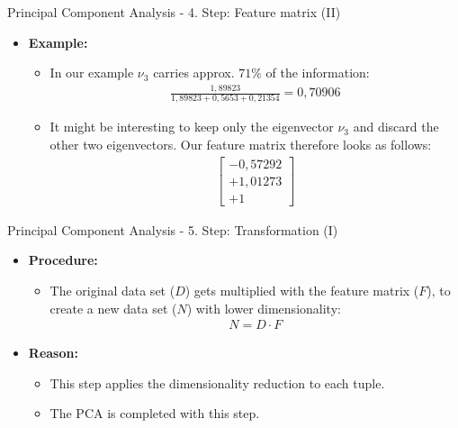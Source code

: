 \begin{frame}{Principal Component Analysis - 4. Step: Feature matrix (II)}
	\begin{itemize}
		\item \textbf{Example:}
		\begin{itemize}
			\item In our example $\nu_3$ carries approx. $71\%$ of the 
			information: \\
			\begin{align}
				\frac{1,89823}{1,89823+0,5653+0,21354} = 0,70906
			\end{align}
			\item It might be interesting to keep only the eigenvector $\nu_3$ 
			and discard the other two eigenvectors. Our feature matrix 
			therefore looks as follows:
			\begin{align}
				\begin{bmatrix} -0,57292 \\ +1,01273 \\ +1\end{bmatrix}
			\end{align}
		\end{itemize}
	\end{itemize}
\end{frame}

\begin{frame}{Principal Component Analysis - 5. Step: Transformation (I)}
	\begin{itemize}
		\item \textbf{Procedure:}
		\begin{itemize}
			\item The original data set ($D$) gets multiplied with the feature 
			matrix ($F$), to create a new data set ($N$) with lower 
			dimensionality:
			\begin{align}
				N = D \cdot F
			\end{align}
		\end{itemize}
		\item \textbf{Reason:}
		\begin{itemize}
			\item This step applies the dimensionality reduction to each tuple.
			\item The PCA is completed with this step.
		\end{itemize}
	\end{itemize}
\end{frame}

